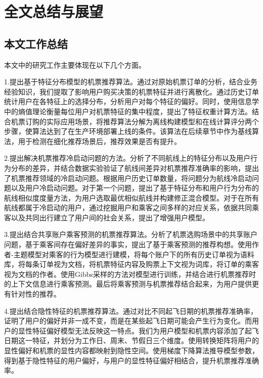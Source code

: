 
\chapter{全文总结与展望}
\label{chap:summary}

\section{本文工作总结}
本文中的研究工作主要体现在以下几个方面。

1.提出基于特征分布模型的机票推荐算法。通过对原始机票订单的分析，结合业务经验知识，我们提取了影响用户购买决策的机票特征并进行离散化。通过历史订单统计用户在各特征上的选择分布，分析用户对每个特征的偏好。同时，使用信息学中的熵值理论衡量每位用户对机票特征的集中程度，提出了特征权重计算方法。结合机票订购的实际应用场景，将推荐算法分解为离线构建模型和在线计算评分两个步骤，使算法达到了在生产环境部署上线的条件。该算法在后续章节中作为基线算法，用于检测在细化推荐场景后，推荐效果是否有提升。

2.提出解决机票推荐冷启动问题的方法。分析了不同航线上的特征分布以及用户行为分布的差异，并结合数据实验验证了航线间差异对机票推荐准确率的影响，提出了机票推荐领域的冷启动问题。根据用户历史订单数量，将问题分为航线冷启动问题以及用户冷启动问题。对于第一个问题，提出了基于特征分布和用户行为分布的航线相似度度量方法，为用户选取最优相似航线并构建修正混合模型。对于在所有航线都属于冷启动的用户，通过挖掘用户和乘客之间多样的对应关系，依据共同乘客以及共同出行建立了用户间的社会关系，提出了增强用户模型。

3.提出结合共享账户乘客预测的机票推荐算法。分析了机票选购场景中的共享账户问题，基于乘客间存在偏好差异的事实，提出了基于乘客预测的推荐构想。使用作者-主题模型对乘客的行为模型进行建模，将每个账户下的所有历史订单视为语料库，将每条订单视为文档，将机票特征内容及购票上下文视为词库，将订单的乘客视为文档的作者。使用Gibbs采样的方法对模型进行训练，并结合进行机票推荐时的上下文信息进行乘客预测。最后将乘客预测与机票推荐结合起来，为用户提供更有针对性的推荐。

4.提出结合隐性特征的机票推荐算法。通过对比不同起飞日期的机票推荐准确率，证明了用户的偏好并非一成不变，而是在某些起飞日期可能会产生行为变化。而用户的显性特征偏好模型无法反映这一特点。我们为用户模型和机票内容添加了起飞日期这一特征，并划分为工作日、周末、节假日三个维度。使用转换矩阵将用户的显性偏好和机票的显性内容都映射到隐性空间。使用梯度下降算法推导模型参数，得到基于隐性特征的用户偏好，与用户的显性特征偏好相结合，提升机票推荐准确率。

